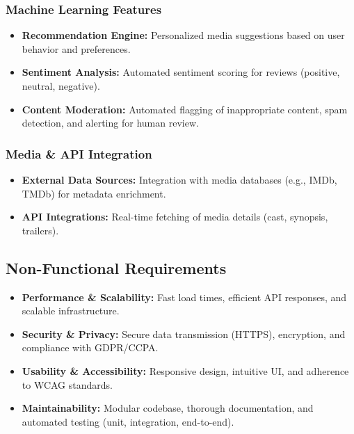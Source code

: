 \documentclass[11pt]{article}
\begin{document}
\subsubsection{Machine Learning Features}
\begin{itemize}[noitemsep]
    \item \textbf{Recommendation Engine:} Personalized media suggestions based on user behavior and preferences.
    \item \textbf{Sentiment Analysis:} Automated sentiment scoring for reviews (positive, neutral, negative).
    \item \textbf{Content Moderation:} Automated flagging of inappropriate content, spam detection, and alerting for human review.
\end{itemize}

\subsubsection{Media \& API Integration}
\begin{itemize}[noitemsep]
    \item \textbf{External Data Sources:} Integration with media databases (e.g., IMDb, TMDb) for metadata enrichment.
    \item \textbf{API Integrations:} Real-time fetching of media details (cast, synopsis, trailers).
\end{itemize}

\subsection{Non-Functional Requirements}
\begin{itemize}[noitemsep]
    \item \textbf{Performance \& Scalability:} Fast load times, efficient API responses, and scalable infrastructure.
    \item \textbf{Security \& Privacy:} Secure data transmission (HTTPS), encryption, and compliance with GDPR/CCPA.
    \item \textbf{Usability \& Accessibility:} Responsive design, intuitive UI, and adherence to WCAG standards.
    \item \textbf{Maintainability:} Modular codebase, thorough documentation, and automated testing (unit, integration, end-to-end).
\end{itemize}
\end{document}
